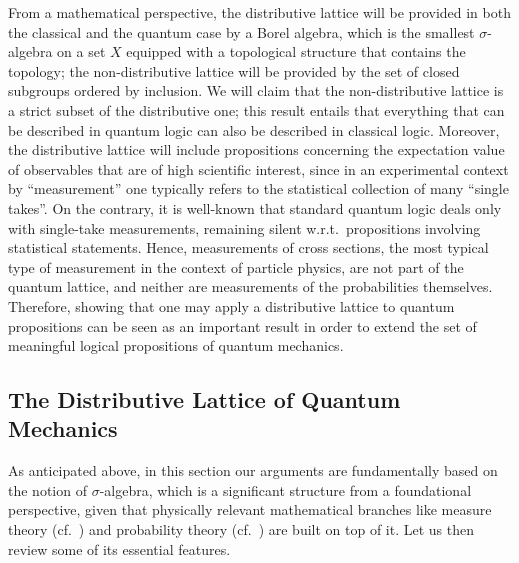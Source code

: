 \documentclass[11pt, executivepaper]{article}
\begin{document}
From a mathematical perspective, the distributive lattice will be provided in both the classical and the quantum case by a Borel algebra, which is the smallest $\sigma$-algebra on a set $X$ equipped with a topological structure that contains the topology; the non-distributive lattice will be provided by the set of closed subgroups ordered by inclusion. We will claim that the non-distributive lattice is a strict subset of the distributive one; this result entails that everything that can be described in quantum logic can also be described in classical logic. Moreover, the distributive lattice will include propositions concerning the expectation value of observables that are of high scientific interest, since in an experimental context by ``measurement'' one typically refers to the statistical collection of many ``single takes''. On the contrary, it is well-known that standard quantum logic deals only with single-take measurements, remaining silent w.r.t.\ propositions involving statistical statements. Hence, measurements of cross sections, the most typical type of measurement in the context of particle physics, are not part of the quantum lattice, and neither are measurements of the probabilities themselves. Therefore, showing that one may apply a distributive lattice to quantum propositions can be seen as an important result in order to extend the set of meaningful logical propositions of quantum mechanics.  

\subsection{The Distributive Lattice of Quantum Mechanics}

As anticipated above, in this section our arguments are fundamentally based on the notion of $\sigma$-algebra, which is a significant structure from a foundational perspective, given that physically relevant mathematical branches like measure theory (cf.\ \cite{Cohn:2013}) and probability theory (cf.\ \cite{Grimmett:2001}) are built on top of it. Let us then review some of its essential features.
\end{document}
